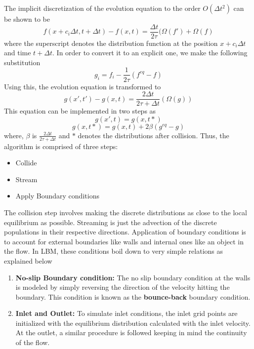 \documentclass[titlepage,a4paper,10pt]{article}
\begin{document}
The implicit discretization of the evolution equation to the order $O(\Delta t^2)$ can be shown to be
\[ f(x+c_i\Delta t,t+\Delta t) - f(x,t) = \frac{\Delta t}{2\tau}(\Omega(f') + \Omega(f) \]
where the superscript denotes the distribution function at the position $x+c_i\Delta t$ and time $t+\Delta t$.
In order to convert it to an explicit one, we make the following substitution
\[ g_i = f_i - \frac{1}{2\tau}(f^{eq} - f) \]
Using this, the evolution equation is transformed to
\begin{equation}
 g(x',t') - g(x,t) = \frac{2\Delta t}{2\tau + \Delta t}(\Omega(g))
\end{equation}
This equation can be implemented in two steps as
\[ g(x',t) = g(x,t*)\]
\[ g(x,t*) = g(x,t) + 2\beta(g^{eq} - g) \]
where, $\beta$ is $\frac{2\Delta t}{2\tau + \Delta t}$ and $*$ denotes the distributions after collision.
Thus, the algorithm is comprised of three steps:
\begin{itemize}
\item Collide
\item Stream
\item Apply Boundary conditions
\end{itemize}
The collision step involves making the discrete distributions as close to the local equilibrium as possible. Streaming is just the 
advection of the discrete populations in their respective directions. Application of boundary conditions is to account for external boundaries like walls and internal ones like an object in the flow. In LBM, these conditions boil down to very simple relations as explained below
\begin{enumerate}
\item \textbf{No-slip Boundary condition:} The no slip boundary condition at the walls is modeled by simply reversing the direction of the velocity hitting the boundary. This condition is known as the \textbf{bounce-back} boundary condition. 
\item \textbf{Inlet and Outlet:} To simulate inlet conditions, the inlet grid points are initialized with the equilibrium distribution calculated with the inlet velocity. At the outlet, a similar procedure is followed keeping in mind the continuity of the flow.
\end{enumerate}
\end{document}
